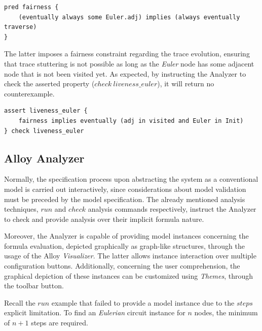\begin{lstlisting}[title={\textit{Fairness predicate}: If \textit{Euler} has an adjacent node, it will eventually visit the latter.}, otherkeywords = {pred, eventually, always, implies, some, \.}]
pred fairness {
	(eventually always some Euler.adj) implies (always eventually traverse)
}
\end{lstlisting}

The latter imposes a fairness constraint regarding the trace evolution, ensuring that trace stuttering is not possible as long as the \textit{Euler} node has some adjacent node that is not been visited yet. As expected, by instructing the Analyzer to check the asserted property ($check\ liveness\_euler$), it will return no counterexample.

\begin{lstlisting}[title={\textit{Liveness} property accounting the fairness constraint. It yields no counterexample.}, otherkeywords = {assert, in, and, eventually, check}]
assert liveness_euler {
	fairness implies eventually (adj in visited and Euler in Init)
} check liveness_euler
\end{lstlisting}

\subsection{Alloy Analyzer}

Normally, the specification process upon abstracting the system as a conventional model is carried out interactively, since considerations about model validation must be preceded by the model specification. The already mentioned analysis techniques, $run$ and $check$ analysis commands respectively, instruct the Analyzer to check and provide analysis over their implicit formula nature. 

Moreover, the Analyzer is capable of providing model instances concerning the formula evaluation, depicted graphically as graph-like structures, through the usage of the Alloy \textit{Visualizer}. The latter allows instance interaction over multiple configuration buttons. Additionally, concerning the user comprehension, the graphical depiction of these instances can be customized using \textit{Themes}, through the  toolbar button.

Recall the $run$ example that failed to provide a model instance due to the $steps$ explicit limitation. To find an \textit{Eulerian} circuit instance for $n$ nodes, the minimum of $n+1$ steps are required.

